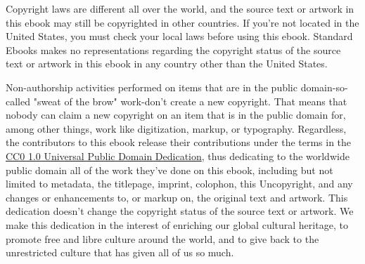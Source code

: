\documentclass[11pt,a4paper]{article}
\begin{document}
Copyright laws are different all over the world, and the source text or artwork in this ebook may still be copyrighted in other countries. If you're not located in the United States, you must check your local laws before using this ebook. Standard Ebooks makes no representations regarding the copyright status of the source text or artwork in this ebook in any country other than the United States.

Non-authorship activities performed on items that are in the public domain-so-called "sweat of the brow" work-don't create a new copyright. That means that nobody can claim a new copyright on an item that is in the public domain for, among other things, work like digitization, markup, or typography. Regardless, the contributors to this ebook release their contributions under the terms in the \href{https://creativecommons.org/publicdomain/zero/1.0/}{CC0 1.0 Universal Public Domain Dedication}, thus dedicating to the worldwide public domain all of the work they've done on this ebook, including but not limited to metadata, the titlepage, imprint, colophon, this Uncopyright, and any changes or enhancements to, or markup on, the original text and artwork. This dedication doesn't change the copyright status of the source text or artwork. We make this dedication in the interest of enriching our global cultural heritage, to promote free and libre culture around the world, and to give back to the unrestricted culture that has given all of us so much.
\end{document}
